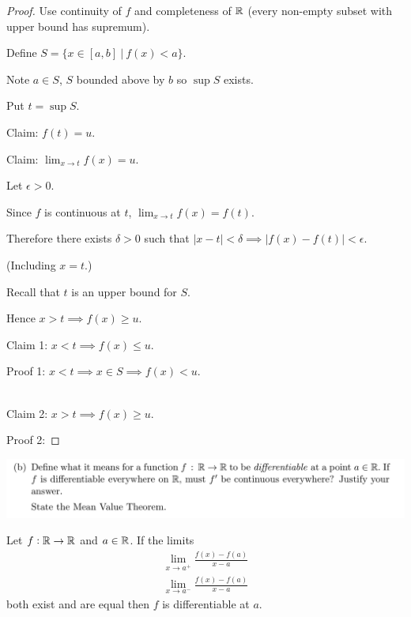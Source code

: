 \documentclass[12pt]{article}
\begin{document}
\begin{proof}
  Use continuity of $f$ and completeness of $\mathbb{R}$ (every non-empty subset with upper bound has
  supremum).

  Define $S = \{x \in [a, b] ~|~ f(x) < a\}$.

  Note $a \in S$, $S$ bounded above by $b$ so $\sup S$ exists.

  Put $t = \sup S$.

  Claim: $f(t) = u$.

  Claim: $\lim_{x\to t} f(x) = u$.

  Let $\epsilon > 0$.

  Since $f$ is continuous at $t$, $\lim_{x \to t} f(x) = f(t)$.

  Therefore there exists $\delta > 0$ such that
  $|x - t| < \delta \implies |f(x) - f(t)| < \epsilon$.

  (Including $x = t$.)

  Recall that $t$ is an upper bound for $S$.

  Hence $x > t \implies f(x) \geq u$.

  Claim 1: $x < t \implies f(x) \leq u$.

  Proof 1: $x < t \implies x \in S \implies f(x) < u$.

  ~\\

  Claim 2: $x > t \implies f(x) \geq u$.

  Proof 2:



\end{proof}

\begin{mdframed}
\includegraphics[width=400pt]{img/misc--cambridge-1a-2017-1-9D-2.png}
\end{mdframed}

\begin{definition*}
  Let $f: \mathbb{R} \to \mathbb{R}$ and $a \in \mathbb{R}$. If the limits
  \begin{align*}
    \lim_{x \to a^+} \frac{f(x) - f(a)}{x - a}\\
    \lim_{x \to a^-} \frac{f(x) - f(a)}{x - a}
  \end{align*}
  both exist and are equal then $f$ is differentiable at $a$.
\end{definition*}
\end{document}
